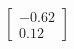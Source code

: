 \documentclass[preview]{standalone}
\begin{document}
\begin{align*}
\begin{bmatrix} -0.62 \\ 0.12 \end{bmatrix}
\end{align*}
\end{document}
